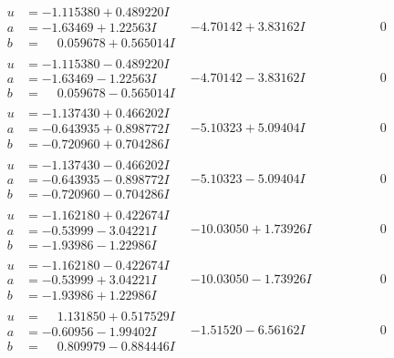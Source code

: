 \documentclass[1p]{elsarticle_modified}
\theoremstyle{definition}
\begin{document}
$$\begin{array}{c|c|c}
\begin{aligned}
u &= -1.115380 + 0.489220 I \\
a &= -1.63469 + 1.22563 I \\
b &= \phantom{-}0.059678 + 0.565014 I\end{aligned}
 & -4.70142 + 3.83162 I & \phantom{-0.000000 } 0 \\ \hline\begin{aligned}
u &= -1.115380 - 0.489220 I \\
a &= -1.63469 - 1.22563 I \\
b &= \phantom{-}0.059678 - 0.565014 I\end{aligned}
 & -4.70142 - 3.83162 I & \phantom{-0.000000 } 0 \\ \hline\begin{aligned}
u &= -1.137430 + 0.466202 I \\
a &= -0.643935 + 0.898772 I \\
b &= -0.720960 + 0.704286 I\end{aligned}
 & -5.10323 + 5.09404 I & \phantom{-0.000000 } 0 \\ \hline\begin{aligned}
u &= -1.137430 - 0.466202 I \\
a &= -0.643935 - 0.898772 I \\
b &= -0.720960 - 0.704286 I\end{aligned}
 & -5.10323 - 5.09404 I & \phantom{-0.000000 } 0 \\ \hline\begin{aligned}
u &= -1.162180 + 0.422674 I \\
a &= -0.53999 - 3.04221 I \\
b &= -1.93986 - 1.22986 I\end{aligned}
 & -10.03050 + 1.73926 I & \phantom{-0.000000 } 0 \\ \hline\begin{aligned}
u &= -1.162180 - 0.422674 I \\
a &= -0.53999 + 3.04221 I \\
b &= -1.93986 + 1.22986 I\end{aligned}
 & -10.03050 - 1.73926 I & \phantom{-0.000000 } 0 \\ \hline\begin{aligned}
u &= \phantom{-}1.131850 + 0.517529 I \\
a &= -0.60956 - 1.99402 I \\
b &= \phantom{-}0.809979 - 0.884446 I\end{aligned}
 & -1.51520 - 6.56162 I & \phantom{-0.000000 } 0 \\ \hline\begin{aligned}

\end{aligned}
\end{array}$$
\end{document}

